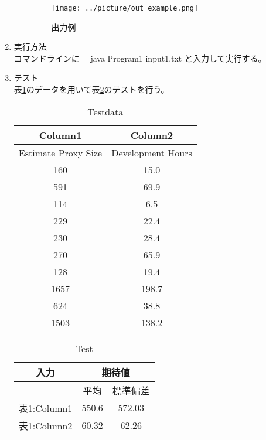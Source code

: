 \documentclass[titlepage,a4paper,12pt]{ltjsreport}
\begin{document}
\begin{enumerate}
\begin{itemize}
        \begin{figure}[h]
            \centering
            \texttt{[image: ../picture/out\_example.png]}
            \caption{出力例}
            \label{out_example}
        \end{figure}

    \end{itemize}

    \item 実行方法\mbox{}\\
    コマンドラインに
    　java Program1 input1.txt
    と入力して実行する。
    \item テスト\mbox{}\\
    表\ref{test_data}のデータを用いて表\ref{test}のテストを行う。
    \begin{table}[h]
        \centering
        \caption{Testdata}
        \label{test_data}
        \begin{tabular}{|c|c|} \hline
            Column1 & Column2 \\ \hline
            Estimate Proxy Size & Development Hours \\ \hline
            160   & 15.0 \\ \hline
            591   & 69.9 \\ \hline
            114   & 6.5 \\ \hline
            229   & 22.4 \\ \hline
            230   & 28.4 \\ \hline
            270   & 65.9 \\ \hline
            128   & 19.4 \\ \hline
            1657  & 198.7 \\ \hline
            624   & 38.8 \\ \hline
            1503  & 138.2 \\ \hline
        \end{tabular}
    \end{table}

    \begin{table}[h]
        \centering
        \caption{Test}
        \label{test}
        \begin{tabular}{|c|c|c|} \hline
            入力 & \multicolumn{2}{|c|}{期待値} \\ \hline
            & 平均 & 標準偏差 \\ \hline
            表1:Column1 & 550.6 & 572.03 \\ \hline
            表1:Column2 & 60.32 & 62.26 \\ \hline
        \end{tabular}
    \end{table}
    
     

\end{enumerate}
\end{document}
